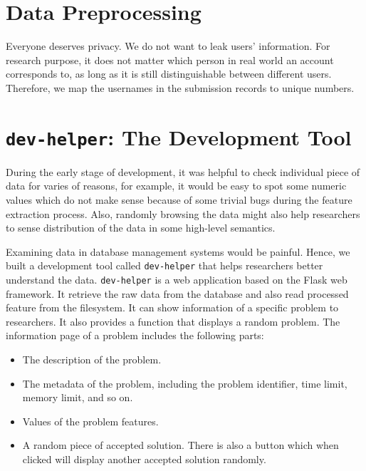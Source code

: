 \section{Data Preprocessing}

    Everyone deserves privacy. We do not want to leak users' information.
    For research purpose, it does not matter which person in real world an account corresponds to,
    as long as it is still distinguishable between different users.
    Therefore, we map the usernames in the submission records to unique numbers.


\section{\texttt{dev-helper}: The Development Tool}

    During the early stage of development,
    it was helpful to check individual piece of data for varies of reasons,
    for example, it would be easy to spot some numeric values which do not make sense
    because of some trivial bugs during the feature extraction process.
    Also, randomly browsing the data might also help researchers to sense distribution of the data
    in some high-level semantics.

    Examining data in database management systems would be painful.
    Hence, we built a development tool called \texttt{dev-helper}
    that helps researchers better understand the data.
    \texttt{dev-helper} is a web application based on the Flask  web framework.
    It retrieve the raw data from the database and also read processed feature from the filesystem.
    It can show information of a specific problem to researchers.
    It also provides a function that displays a random problem.
    The information page of a problem includes the following parts: 

    \begin{itemize}
        \item The description of the problem.
        \item The metadata of the problem, including the problem identifier, time limit, memory limit, and so on.
        \item Values of the problem features.
        \item A random piece of accepted solution.
            There is also a button which when clicked will display another accepted solution randomly.
    \end{itemize}

